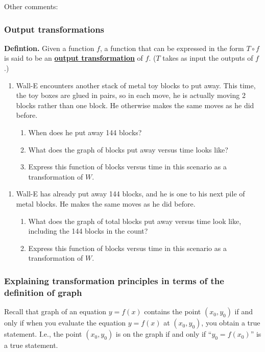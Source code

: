 \documentclass[11pt]{article}
\newcommand{\handout}{\subsubsection}
\renewcommand\emph[1]{\underline{\bf{#1}}} %
\theoremstyle{definition}
\begin{document}
Other comments:


\newpage \handout{Output transformations}

{\bf Defintion.}
Given a function $f$, a function that can be expressed in the form $T\circ f$ is said to be an \emph{output transformation} of $f$. ($T$ takes as input the outputs of $f$.)

\begin{enumerate} \item Wall-E encounters another stack of metal toy blocks to put away. This time, the toy boxes are glued in pairs, so in each move, he is actually moving 2 blocks rather than one block.  He otherwise makes the same moves as he did before. 
\begin{enumerate} 
\item When does he put away 144 blocks?
\item What does the graph of blocks put away versus time looks like?
\item Express this function of blocks versus time in this scenario as a transformation of $W$.
\end{enumerate}
\end{enumerate}

\vfill

\begin{enumerate}[resume]
 \item  Wall-E has already put away 144 blocks, and he is one to his next pile of metal blocks.  He makes the same moves as he did before. 
\begin{enumerate}
\item What does the graph of total blocks put away versus time look like, including the 144 blocks in the count?
\item Express this function of blocks versus time in this scenario as a transformation of $W$.
\end{enumerate}
\end{enumerate}

\vfill
\newpage
\handout{Explaining transformation principles in terms of the definition of graph}

Recall that graph of an equation $y=f(x)$ contains the point $(x_0,y_0)$ if and only if when you evaluate the equation $y=f(x)$ at $(x_0, y_0)$, you obtain a true statement. I.e., the point $(x_0,y_0)$ is on the graph if and only if ``$y_0=f(x_0)$'' is a true statement. 
\end{document}
